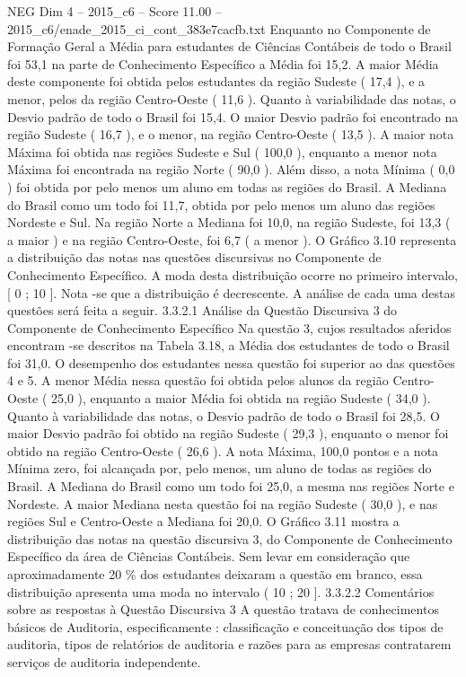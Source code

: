 \begin{textsample}{NEG Dim 4 – 2015\_c6 – Score 11.00 – 2015\_c6/enade\_2015\_ci\_cont\_383e7cacfb.txt}
Enquanto no Componente de Formação Geral a Média para estudantes de Ciências Contábeis de todo o Brasil foi 53,1 na parte de Conhecimento Específico a Média foi 15,2.
A maior Média deste componente foi obtida pelos estudantes da região Sudeste ( 17,4 ), e a menor, pelos da região Centro-Oeste ( 11,6 ).
Quanto à variabilidade das notas, o Desvio padrão de todo o Brasil foi 15,4.
O maior Desvio padrão foi encontrado na região Sudeste ( 16,7 ), e o menor, na região Centro-Oeste ( 13,5 ).
A maior nota Máxima foi obtida nas regiões Sudeste e Sul ( 100,0 ), enquanto a menor nota Máxima foi encontrada na região Norte ( 90,0 ).
Além disso, a nota Mínima ( 0,0 ) foi obtida por pelo menos um aluno em todas as regiões do Brasil.
A Mediana do Brasil como um todo foi 11,7, obtida por pelo menos um aluno das regiões Nordeste e Sul.
Na região Norte a Mediana foi 10,0, na região Sudeste, foi 13,3 ( a maior ) e na região Centro-Oeste, foi 6,7 ( a menor ).
O Gráfico 3.10 representa a distribuição das notas nas questões discursivas no Componente de Conhecimento Específico.
A moda desta distribuição ocorre no primeiro intervalo, [ 0 ; 10 ].
Nota -se que a distribuição é decrescente.
A análise de cada uma destas questões será feita a seguir. 3.3.2.1 Análise da Questão Discursiva 3 do Componente de Conhecimento Específico Na questão 3, cujos resultados aferidos encontram -se descritos na Tabela 3.18, a Média dos estudantes de todo o Brasil foi 31,0.
O desempenho dos estudantes nessa questão foi superior ao das questões 4 e 5.
A menor Média nessa questão foi obtida pelos alunos da região Centro-Oeste ( 25,0 ), enquanto a maior Média foi obtida na região Sudeste ( 34,0 ).
Quanto à variabilidade das notas, o Desvio padrão de todo o Brasil foi 28,5.
O maior Desvio padrão foi obtido na região Sudeste ( 29,3 ), enquanto o menor foi obtido na região Centro-Oeste ( 26,6 ).
A nota Máxima, 100,0 pontos e a nota Mínima zero, foi alcançada por, pelo menos, um aluno de todas as regiões do Brasil.
A Mediana do Brasil como um todo foi 25,0, a mesma nas regiões Norte e Nordeste.
A maior Mediana nesta questão foi na região Sudeste ( 30,0 ), e nas regiões Sul e Centro-Oeste a Mediana foi 20,0.
O Gráfico 3.11 mostra a distribuição das notas na questão discursiva 3, do Componente de Conhecimento Específico da área de Ciências Contábeis.
Sem levar em consideração que aproximadamente 20 \% dos estudantes deixaram a questão em branco, essa distribuição apresenta uma moda no intervalo ( 10 ; 20 ]. 3.3.2.2 Comentários sobre as respostas à Questão Discursiva 3 A questão tratava de conhecimentos básicos de Auditoria, especificamente : classificação e conceituação dos tipos de auditoria, tipos de relatórios de auditoria e razões para as empresas contratarem serviços de auditoria independente.

\end{textsample}
